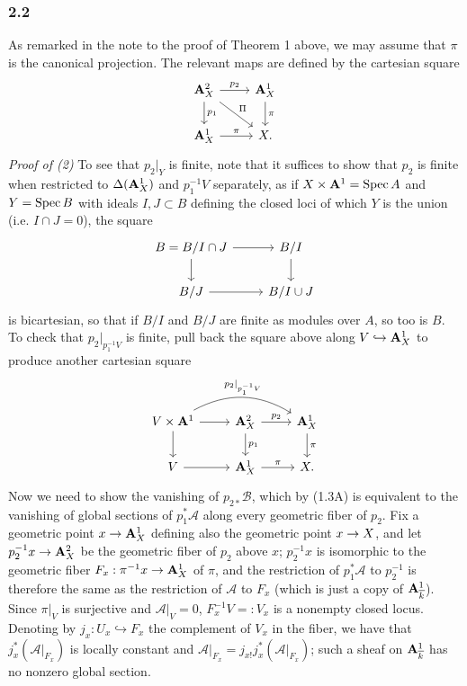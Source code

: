 \documentclass[deligne.tex]{subfiles}
\begin{document}
\subsubsection*{2.2}
As remarked in the note to the proof of Theorem 1 above, we may assume
that $\pi$ is the canonical projection.
The relevant maps are defined by the cartesian square
\begin{equation*}\begin{tikzcd}
	\A^2_X\arrow[r,"p_2"]\arrow[dr,"\Pi"]\arrow[d,"p_1"]
	&\A^1_X\arrow[d,"\pi"] \\
	\A^1_X\arrow[r,"\pi"]&X.
\end{tikzcd}\end{equation*}
\emph{Proof of (2)}\quad
To see that $p_2|_Y$ is finite, note that it suffices to show that $p_2$ 
is finite when restricted to $\Delta(\mathbf{A}^1_X)$ and $p_1^{-1}V$ separately, as
if $X\times\mathbf{A}^1=\operatorname{Spec} A$ and $Y=\operatorname{Spec} B$ with ideals $I,J\subset B$ defining
the closed loci of which $Y$ is the union (i.e. $I\cap J=0$), the square
\begin{equation*}\begin{tikzcd}
	B=B/I\cap J\arrow[d]\arrow[r]&B/I\arrow[d] \\
	B/J\arrow[r]&B/I\cup J
\end{tikzcd}\end{equation*}
is bicartesian, so that if $B/I$ and $B/J$ are finite as modules over $A$, 
so too is $B$. To check that $p_2|_{p_1^{-1}V}$ is finite, pull back the 
square above along $V\hookrightarrow\mathbf{A}^1_X$ to produce another cartesian 
square
\begin{equation*}\begin{tikzcd}
	V\times\A^1\arrow[d]\arrow[r]\arrow[rr,bend left,"p_2|_{p_1^{-1}V}"]
	&\A^2_X\arrow[r,"p_2"]\arrow[d,"p_1"]
	&\A^1_X\arrow[d,"\pi"] \\
	V\arrow[r]&\A^1_X\arrow[r,"\pi"]&X.
\end{tikzcd}\end{equation*}
Now we need to show the vanishing of $p_{2*}\mathcal B$, which by (1.3A) is
equivalent to the vanishing of global sections of $p_1^*\mathcal A$ along
every geometric fiber of $p_2$. Fix a geometric point $x\rightarrow\mathbf{A}^1_X$ defining
also the geometric point $x\rightarrow X$, and let $p_2^{-1}x\rightarrow\mathbf{A}^2_X$ be the
geometric fiber of $p_2$ above $x$; $p_2^{-1}x$ is isomorphic to the
geometric fiber $F_x:\pi^{-1}x\rightarrow\mathbf{A}^1_X$ of $\pi$, and the restriction of
$p_1^*\mathcal A$ to $p_2^{-1}$ is therefore the same as the restriction of
$\mathcal A$ to $F_x$ (which is just a copy of $\mathbf{A}^1_{\overline k}$).
Since $\pi|_V$ is surjective and $\mathcal A|_V=0$, $F_x^{-1}V=:V_x$ is a
nonempty closed locus. Denoting by $j_x:U_x\hookrightarrow F_x$ the
complement of $V_x$ in the fiber, we have that
$j_x^*(\mathcal A|_{F_x})$ is locally constant and
$\mathcal A|_{F_x}=j_{x!}j_x^*(\mathcal A|_{F_x})$; such a sheaf on
$\mathbf{A}^1_{\overline k}$ has no nonzero global section.
\end{document}
